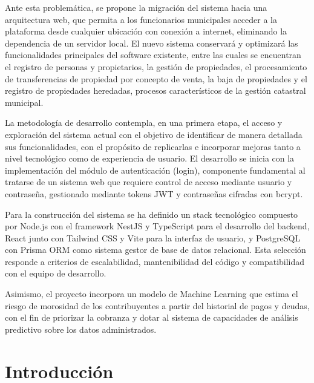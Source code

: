 \documentclass[12pt,a4paper]{report}
\begin{document}
Ante esta problemática, se propone la migración del sistema hacia una arquitectura web, que permita a los funcionarios municipales acceder a la plataforma desde cualquier ubicación con conexión a internet, eliminando la dependencia de un servidor local. El nuevo sistema conservará y optimizará las funcionalidades principales del software existente, entre las cuales se encuentran el registro de personas y propietarios, la gestión de propiedades, el procesamiento de transferencias de propiedad por concepto de venta, la baja de propiedades y el registro de propiedades heredadas, procesos característicos de la gestión catastral municipal.

La metodología de desarrollo contempla, en una primera etapa, el acceso y exploración del sistema actual con el objetivo de identificar de manera detallada sus funcionalidades, con el propósito de replicarlas e incorporar mejoras tanto a nivel tecnológico como de experiencia de usuario. El desarrollo se inicia con la implementación del módulo de autenticación (login), componente fundamental al tratarse de un sistema web que requiere control de acceso mediante usuario y contraseña, gestionado mediante tokens JWT y contraseñas cifradas con bcrypt.

Para la construcción del sistema se ha definido un stack tecnológico compuesto por Node.js con el framework NestJS y TypeScript para el desarrollo del backend, React junto con Tailwind CSS y Vite para la interfaz de usuario, y PostgreSQL con Prisma ORM como sistema gestor de base de datos relacional. Esta selección responde a criterios de escalabilidad, mantenibilidad del código y compatibilidad con el equipo de desarrollo.

Asimismo, el proyecto incorpora un modelo de Machine Learning que estima el riesgo de morosidad de los contribuyentes a partir del historial de pagos y deudas, con el fin de priorizar la cobranza y dotar al sistema de capacidades de análisis predictivo sobre los datos administrados.



\tableofcontents
\listoftables
\listoffigures

\chapter*{Introducción}
\end{document}

